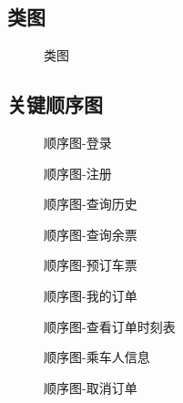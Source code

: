 \documentclass{article}
\begin{document}
	\subsection{类图}
	\begin{figure}[H]
		\centering
		
		\caption{类图}
		\label{类图}
	\end{figure}
	
	\subsection{关键顺序图}
	\begin{figure}[H]
		\centering
		
		\caption{顺序图-登录}
		\label{顺序图-登录}
	\end{figure}
	\begin{figure}[H]
		\centering
		
		\caption{顺序图-注册}
		\label{顺序图-注册}
	\end{figure}
	\begin{figure}[H]
		\centering
		
		\caption{顺序图-查询历史}
		\label{顺序图-查询历史}
	\end{figure}
	\begin{figure}[H]
		\centering
		
		\caption{顺序图-查询余票}
		\label{顺序图-查询余票}
	\end{figure}
	\begin{figure}[H]
		\centering
		
		\caption{顺序图-预订车票}
		\label{顺序图-预订车票}
	\end{figure}
	\begin{figure}[H]
		\centering
		
		\caption{顺序图-我的订单}
		\label{顺序图-我的订单}
	\end{figure}
	\begin{figure}[H]
		\centering
		
		\caption{顺序图-查看订单时刻表}
		\label{顺序图-查看订单时刻表}
	\end{figure}
	\begin{figure}[H]
		\centering
		
		\caption{顺序图-乘车人信息}
		\label{顺序图-乘车人信息}
	\end{figure}
	\begin{figure}[H]
		\centering
		
		\caption{顺序图-取消订单}
		\label{顺序图-取消订单}
	\end{figure}
\end{document}
